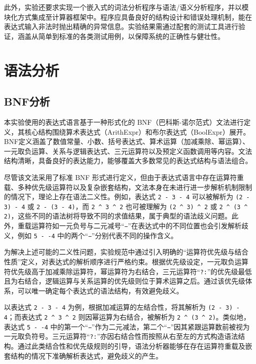 \documentclass[a4paper, twoside, utf8]{ctexart}
\begin{document}
    此外，实验还要求实现一个嵌入式的词法分析程序与语法/语义分析程序，并以模块化方式集成至计算器框架中。程序应具备良好的结构设计和错误处理机制，能在表达式输入非法时抛出精确的异常信息。实验结果需通过配套的测试工具进行验证，涵盖从简单到标准的各类测试用例，以保障系统的正确性与健壮性。

    \section{语法分析}

    \subsection{BNF分析}

    本实验使用的表达式语言基于一种形式化的 BNF（巴科斯-诺尔范式）文法进行定义，其核心结构围绕算术表达式（ArithExpr）和布尔表达式（BoolExpr）展开。BNF定义涵盖了数值常量、小数、括号表达式、算术运算（加减乘除、幂运算）、一元取负运算、关系与逻辑表达式、三元运算符以及预定义函数调用等内容。文法结构清晰，具备良好的表达能力，能够覆盖大多数常见的表达式结构与语法组合。

    尽管该文法采用了标准 BNF 形式进行定义，但由于表达式语言中存在运算符重载、多种优先级运算符以及复杂嵌套结构，文法本身在未进行进一步解析机制限制的情况下，理论上存在语法二义性。例如，表达式 \verb|2 - 3 - 4| 可以被解析为 \verb|(2 - 3) - 4| 或 \verb|2 - (3 - 4)|，而 \verb|2 ^ 3 ^ 2| 也可被理解为 \verb|(2 ^ 3) ^ 2| 或 \verb|2 ^ (3 ^ 2)|，这些不同的语法树将导致不同的求值结果，属于典型的语法歧义问题。此外，重载运算符如一元负号与二元减号“\verb|−|”在表达式中的不同位置也会引发解析歧义，例如 \verb|5 - -4| 中的两个“\verb|−|”分别代表不同的操作含义。
    
    为解决上述可能的二义性问题，实验规范中通过引入明确的“运算符优先级与结合性质”定义，对表达式的解析顺序进行严格约束。根据优先级设定，一元取负运算符优先级高于加减乘除运算符，幂运算符为右结合，三元运算符“\verb|?:|”的优先级最低且为右结合，逻辑运算与关系运算的优先级则位于算术运算之后。通过该优先级体系，可以唯一确定每个表达式的语法结构，有效避免歧义。
    
    以表达式 \verb|2 - 3 - 4| 为例，根据加减运算的左结合性，将其解析为 \verb|(2 - 3) - 4|；而表达式 \verb|2 ^ 3 ^ 2| 则因幂运算为右结合，被解析为 \verb|2 ^ (3 ^ 2)|。类似地，表达式 \verb|5 - -4| 中的第一个“\verb|−|”作为二元减法，第二个“\verb|−|”因其紧跟运算数前被视为一元取负符号。三元运算符“\verb|?:|”亦因右结合性而按照从右至左的方式构造语法结构。通过此类结合性和优先级规则的引导，语法分析器能够在存在运算符重载及嵌套结构的情况下准确解析表达式，避免歧义的产生。
\end{document}
